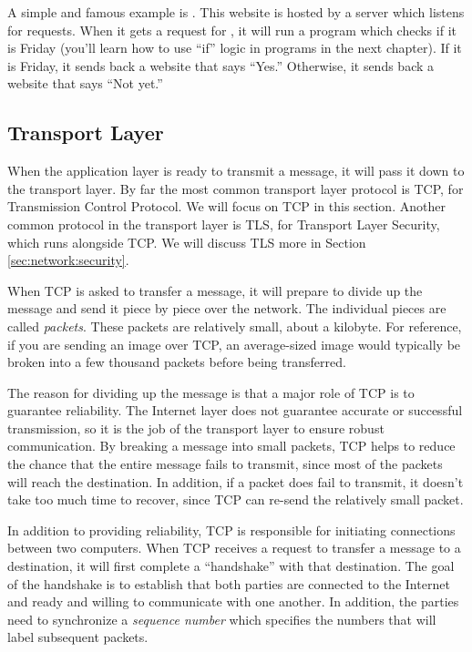 A simple and famous example is . This website is hosted by a server which listens for requests. When it gets a request for , it will run a program which checks if it is Friday (you'll learn how to use ``if'' logic in programs in the next chapter). If it is Friday, it sends back a website that says ``Yes.'' Otherwise, it sends back a website that says ``Not yet.''

\subsection{Transport Layer}

When the application layer is ready to transmit a message, it will pass it down to the transport layer. By far the most common transport layer protocol is TCP, for Transmission Control Protocol. We will focus on TCP in this section. Another common protocol in the transport layer is TLS, for Transport Layer Security, which runs alongside TCP. We will discuss TLS more in Section \ref{sec:network:security}.

When TCP is asked to transfer a message, it will prepare to divide up the message and send it piece by piece over the network. The individual pieces are called \emph{packets}. These packets are relatively small, about a kilobyte. For reference, if you are sending an image over TCP, an average-sized image would typically be broken into a few thousand packets before being transferred. 

The reason for dividing up the message is that a major role of TCP is to guarantee reliability. 
The Internet layer does not guarantee accurate or successful transmission, so it is the job of the transport layer to ensure robust communication. By breaking a message into small packets, TCP helps to reduce the chance that the entire message fails to transmit, since most of the packets will reach the destination. In addition, if a packet does fail to transmit, it doesn't take too much time to recover, since TCP can re-send the relatively small packet.

In addition to providing reliability, TCP is responsible for initiating connections between two computers. When TCP receives a request to transfer a message to a destination, it will first complete a ``handshake'' with that destination. The goal of the handshake is to establish that both parties are connected to the Internet and ready and willing to communicate with one another. In addition, the parties need to synchronize a \emph{sequence number} which specifies the numbers that will label subsequent packets.

